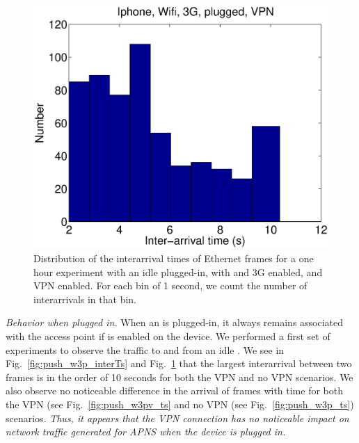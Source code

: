 
\begin{figure}
\centering
        \includegraphics[width=0.8\linewidth]{../../code/pushNotification/Fig/bw_iphone_wifi_3g_plug_vpn_interTs.eps}
  \caption{Distribution of the interarrival times of Ethernet frames
    for a one hour experiment with an idle \iphone{} plugged-in, with \wifi{} and 3G
    enabled, and VPN enabled. For each bin of 1 second, we count
    the number of interarrivals in that bin.}
  \label{fig:push_w3pv_interTs}
\end{figure}


\emph{Behavior when plugged in.} When an \iphone{} is plugged-in, it always remains associated with the
\wifi{} access point if \wifi{} is enabled on the device. We performed
a first set of experiments to observe the traffic to and from an idle
\iphone{}. We see in Fig.~\ref{fig:push_w3p_interTs} and
Fig.~\ref{fig:push_w3pv_interTs} that the largest interarrival between
two frames is in the order of 10 seconds for both the VPN and no VPN
scenarios. We also observe no noticeable difference in the arrival of
frames with time for both the VPN (see Fig.~\ref{fig:push_w3pv_ts} and
no VPN (see Fig.~\ref{fig:push_w3p_ts}) scenarios. \emph{Thus, it 
appears that the VPN connection has no noticeable impact on 
network traffic generated for APNS when the device is plugged in.}

